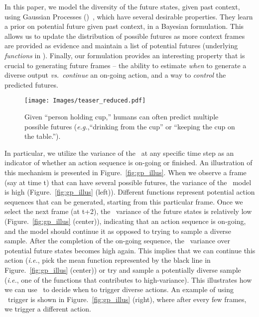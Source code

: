 \documentclass{article} \usepackage{iclr2021_conference,times}
\newcommand{\GP}{}
\def\eg{\emph{e.g.}}
\def\ie{\emph{i.e.}}
\def\vs{\emph{vs.}}
\begin{document}
In this paper, we model the diversity of the future states, given past context, using Gaussian Processes (\GP)~\citep{Rasmussen06gaussianprocesses}, which have several desirable properties. They learn a prior on potential future given past context, in a Bayesian formulation. This allows us to update the distribution of possible futures as more context frames are provided as evidence and maintain a list of potential futures (underlying \emph{functions} in \GP). Finally, our formulation provides an interesting property that is crucial to generating future frames -- the ability to estimate \emph{when} to generate a diverse output \vs\ \emph{continue} an on-going action, and a way to \emph{control} the predicted futures. 



\begin{figure}
   \centering
    \texttt{[image: Images/teaser\_reduced.pdf]}
    \vspace{-0.2in}
    \caption{Given ``person holding cup,'' humans can often predict multiple possible futures (\eg,``drinking from the cup'' or ``keeping the cup on the table.'').}
    \vspace{-0.15in}
  \label{fig:diverse_illus}
\end{figure} 



In particular, we utilize the variance of the \GP\ at any specific time step as an indicator of whether an action sequence is on-going or finished. An illustration of this mechanism is presented in Figure.~\ref{fig:gp_illus}. When we observe a frame (say at time t) that can have several possible futures, the variance of the \GP\ model is high (Figure.~\ref{fig:gp_illus} (left)). Different functions represent potential action sequences that can be generated, starting from this particular frame. Once we select the next frame (at t+2), the \GP\ variance of the future states is relatively low (Figure.~\ref{fig:gp_illus} (center)), indicating that an action sequence is on-going, and the model should continue it as opposed to trying to sample a diverse sample. After the completion of the on-going sequence, the \GP\ variance over potential future states becomes high again. This implies that we can continue this action (\ie, pick the mean function represented by the black line in Figure.~\ref{fig:gp_illus} (center)) or try and sample a potentially diverse sample (\ie, one of the functions that contributes to high-variance). This illustrates how we can use \GP\ to decide when to trigger diverse actions. An example of using \GP\ trigger is shown in Figure.~\ref{fig:gp_illus} (right), where after every few frames, we trigger a different action.
\end{document}
